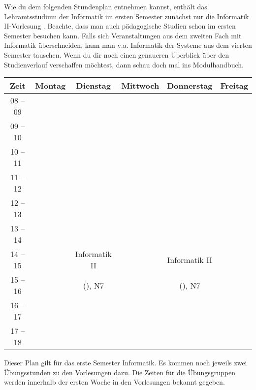 Wie du dem folgenden Stundenplan entnehmen kannst, enthält das Lehramtsstudium der Informatik im ersten Semester zunächst nur die Informatik II-Vorlesung . %
Beachte, dass man auch pädagogische Studien schon im ersten Semester besuchen kann. Falls sich Veranstaltungen aus dem zweiten
Fach mit Informatik überschneiden, kann man v.a. Informatik der Systeme aus dem vierten Semester tauschen.
Wenn du dir noch einen genaueren Überblick über den Studienverlauf verschaffen möchtest, dann schau doch mal ins Modulhandbuch.

\begin{center}
	\begin{tabular}{|c|c|c|c|c|c|} \hline
		Zeit      & 			Montag 		& Dienstag			& Mittwoch 			& Donnerstag 			& Freitag	 \\
		\hline\hline
		08 -- 09  & 						&  					& 					&  						&			\\
		\hline
		09 -- 10  & 						 & 					& 					  &  					&			\\
		\hline
		10 -- 11  &	&					&					&						&			\\
		\cline{1-1}\cline{3-6}
		11 -- 12 & 	&  					&					&			 			& 			\\
		\hline
		12 -- 13 & 							& 				 	& 				    & 						& 			 \\
		\hline
		13 -- 14 & 							& 					& 	& 						& 			 \\
		\hline
		14 -- 15 & 							& Informatik II 		& 					& Informatik II 			& 				\\
		\cline{1-2}\cline{4-4}\cline{6-6}
		15 -- 16 &							 & (\Infoprof), N7 	& 					& (\Infoprof), N7 		& 				\\
		\hline
		16 -- 17 & & & & &\\
		\hline
		17 -- 18 & & & & & \\
		\hline
	\end{tabular}


\end{center}

Dieser Plan gilt für das erste Semester Informatik. Es kommen noch jeweils zwei Übungsstunden zu den Vorlesungen dazu.
Die Zeiten für die Übungsgruppen werden innerhalb der ersten Woche in den Vorlesungen bekannt gegeben. \\
